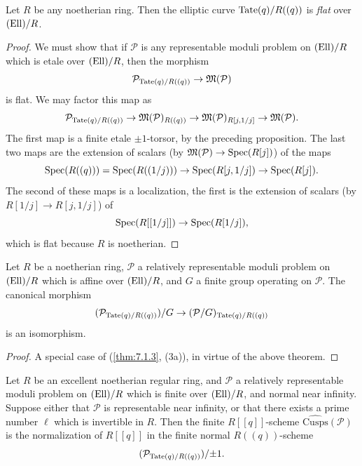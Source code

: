 \begin{kthm}\label{thm:8.11.8}
Let $R$ be any noetherian ring. Then the elliptic curve $\mathrm{Tate}(q)/R((q))$ is \emph{flat} over $(\mathrm{Ell})/R$.
\end{kthm}

\begin{proof}
We must show that if $\mathcal{P}$ is any representable moduli problem on $(\mathrm{Ell})/R$ which is etale over $(\mathrm{Ell})/R$, then the morphism
\[
\mathcal{P}_{\mathrm{Tate}(q)/R((q))} \to \mathfrak{M}(\mathcal{P})
\]
is flat. We may factor this map as
\[
\mathcal{P}_{\mathrm{Tate}(q)/R((q))} \to \mathfrak{M}(\mathcal{P})_{R((q))} \to \mathfrak{M}(\mathcal{P})_{R[j, 1/j]} \to \mathfrak{M}(\mathcal{P}) .
\]
The first map is a finite etale $\pm 1$-torsor, by the preceding proposition. The last two maps are the extension of scalars (by $\mathfrak{M}(\mathcal{P}) \to \operatorname{Spec}(R[j])$) of the maps
\[
\operatorname{Spec}(R((q))) = \operatorname{Spec}(R((1/j))) \to \operatorname{Spec}(R[j, 1/j]) \to \operatorname{Spec}(R[j]) .
\]
The second of these maps is a localization, the first is the extension of scalars (by $R[1/j] \to R[j,1/j]$) of
\[
\operatorname{Spec}(R[[1/j]]) \to \operatorname{Spec}(R[1/j]) ,
\]
which is flat because $R$ is noetherian.
\end{proof}

\begin{kcor}\label{cor:8.11.9}
Let $R$ be a noetherian ring, $\mathcal{P}$ a relatively representable moduli problem on $(\mathrm{Ell})/R$ which is affine over $(\mathrm{Ell})/R$, and $G$ a finite group operating on $\mathcal{P}$. The canonical morphism
\[
(\mathcal{P}_{\mathrm{Tate}(q)/R((q))})/G \to (\mathcal{P}/G)_{\mathrm{Tate}(q)/R((q))}
\]
is an isomorphism.
\end{kcor}

\begin{proof}
A special case of (\ref{thm:7.1.3}, (3a)), in virtue of the above theorem.
\end{proof}

\begin{kthm}\label{thm:8.11.10}
Let $R$ be an excellent noetherian regular ring, and $\mathcal{P}$ a relatively representable moduli problem on $(\mathrm{Ell})/R$ which is finite over $(\mathrm{Ell})/R$, and normal near infinity. Suppose either that $\mathcal{P}$ is representable near infinity, or that there exists a prime number $\ell$ which is invertible in $R$. Then the finite $R[[q]]$-scheme $\widehat{\mathrm{Cusps}}(\mathcal{P})$ is the normalization of $R[[q]]$ in the finite normal $R((q))$-scheme
\[
(\mathcal{P}_{\mathrm{Tate}(q)/R((q))})/{\pm 1} .
\]
\end{kthm}

